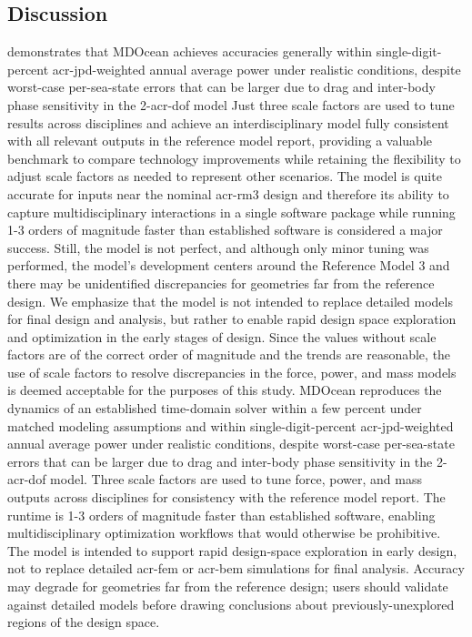 \subsection{Discussion}
\ifdefined\DISSERTATION
     demonstrates that MDOcean achieves accuracies generally within single-digit-percent \gls{acr-jpd}-weighted annual average power under realistic conditions, despite worst-case per-sea-state errors that can be larger due to drag and inter-body phase sensitivity in the 2-\gls{acr-dof} model %
    Just three scale factors are used to tune results across disciplines and achieve an interdisciplinary model fully consistent with all relevant outputs in the reference model report, providing a valuable benchmark to compare technology improvements while retaining the flexibility to adjust scale factors as needed to represent other scenarios.
    The model is quite accurate for inputs near the nominal \gls{acr-rm3} design and therefore its ability to capture multidisciplinary interactions in a single software package while running 1-3 orders of magnitude faster than established software is considered a major success.
    Still, the model is not perfect, and although only minor tuning was performed, the model's development centers around the Reference Model 3 and there may be unidentified discrepancies for geometries far from the reference design.
    We emphasize that the model is not intended to replace detailed models for final design and analysis, but rather to enable rapid design space exploration and optimization in the early stages of design.
    Since the values without scale factors are of the correct order of magnitude and the trends are reasonable, the use of scale factors to resolve discrepancies in the force, power, and mass models is deemed acceptable for the purposes of this study.
\else
    MDOcean reproduces the dynamics of an established time-domain solver within a few percent under matched modeling assumptions and within single-digit-percent \gls{acr-jpd}-weighted annual average power under realistic conditions, despite worst-case per-sea-state errors that can be larger due to drag and inter-body phase sensitivity in the 2-\gls{acr-dof} model.
    Three scale factors are used to tune force, power, and mass outputs across disciplines for consistency with the reference model report.
    The \resultsAOR[simRuntime] runtime is 1-3 orders of magnitude faster than established software, enabling multidisciplinary optimization workflows that would otherwise be prohibitive.
    The model is intended to support rapid design-space exploration in early design, not to replace detailed \gls{acr-fem} or \gls{acr-bem} simulations for final analysis.
    Accuracy may degrade for geometries far from the reference design; users should validate against detailed models before drawing conclusions about previously-unexplored regions of the design space.
\fi